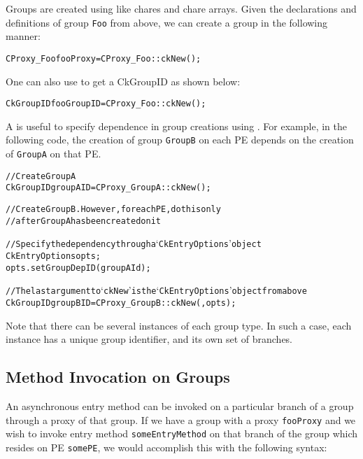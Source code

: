 Groups are created using  like chares and chare arrays.
Given the declarations and definitions of group {\tt Foo}
from above, we can create a group in the following manner:

\begin{alltt}
CProxy_Foo fooProxy = CProxy_Foo::ckNew();
\end{alltt}

One can also use  to get a CkGroupID as shown below:

\begin{alltt}
CkGroupID fooGroupID = CProxy_Foo::ckNew();
\end{alltt}

A  is useful to specify dependence in group creations using
. For example, in the following code, the creation of group
{\tt GroupB} on each PE depends on the creation of {\tt GroupA} on that PE.

\begin{alltt}
// Create GroupA
CkGroupID groupAID = CProxy_GroupA::ckNew();

// Create GroupB. However, for each PE, do this only 
// after GroupA has been created on it

// Specify the dependency through a `CkEntryOptions' object
CkEntryOptions opts;
opts.setGroupDepID(groupAId);

// The last argument to `ckNew' is the `CkEntryOptions' object from above
CkGroupID groupBID = CProxy_GroupB::ckNew(, opts);
\end{alltt}


Note that there can be several instances of each group type.
In such a case, each instance has a unique group identifier, and its own set
of branches.

\subsection{Method Invocation on Groups}

An asynchronous entry method can be invoked on a particular branch of a
group through a proxy of that group. If we have a group with a proxy
{\tt fooProxy} and we wish to invoke entry method {\tt someEntryMethod} on
that branch of the group which resides on PE {\tt somePE}, we would accomplish
this with the following syntax:

